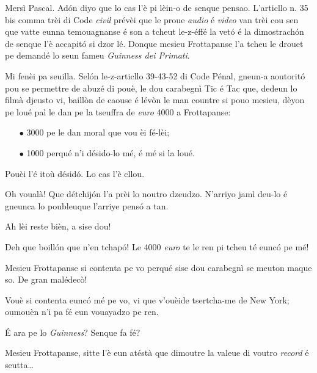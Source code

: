 \begin{drama}

\DzeudzoSenliquerspeaks Mersì Pascal. Adón diyo que lo cas l'è pi lèin-o de senque pensao. L'articllo n. 35 bis comma trèi di Code \textit{civil} prévèi que le proue \textit{audio} é \textit{video} van trèi cou sen que vatte eunna temouagnanse é son a tcheut le-z-éffé la vetó é la dimostrachón de senque l’è accapitó si dzor lé. Donque mesieu Frottapanse l'a tcheu le drouet pe demandé lo seun fameu \textit{Guinness dei Primati}.


\DzeudzoSenliquerspeaks Mi fenèi pa seuilla. Selón le-z-articllo 39-43-52 di Code Pénal, gneun-a aoutoritó pou se permettre de abuzé di pouè, le dou carabegnì Tic é Tac que, dedeun lo filmà djeusto vi, baillòn de caouse é lévòn le man countre si pouo mesieu, dèyon pe loué paì le dan pe la tseuffra de \textit{euro} 4000 a Frottapanse: 
\begin{itemize}
\item[$\bullet$] 3000 pe le dan moral que vou èi fé-lèi;
\item[$\bullet$] 1000 perqué n’i désido-lo mé, é mé si la loué.
\end{itemize}
Pouèi l'é itoù désidó. Lo cas l'è cllou. 


\Ritaspeaks Oh voualà! Que détchijón l’a prèi lo noutro dzeudzo. N'arriyo jamì deu-lo é gneunca lo poubleuque l'arriye pensó a tan.

\Cienspeaks Ah lèi reste bièn, a sise dou!

\Ticspeaks{} Deh que boillón que n'en tchapó! Le 4000 \textit{euro} te le ren pi tcheu té eunc\'o pe mé!

\Ritaspeaks Mesieu Frottapanse si contenta pe vo perqué sise dou carabegnì se meuton maque so. De gran malédec\`o!

\Tissotspeaks Vouè si contenta eunc\'o mé pe vo, vi que v'ouèide tsertcha-me de New York; oumouèn n’i pa fé eun vouayadzo pe ren.

\Cienspeaks É ara pe lo \textit{Guinness}? Senque fa fé?

\Tissotspeaks Mesieu Frottapanse, sitte l’è eun atéstà que dimoutre la valeue di voutro \textit{record} é seutta\ldots


\end{drama}
